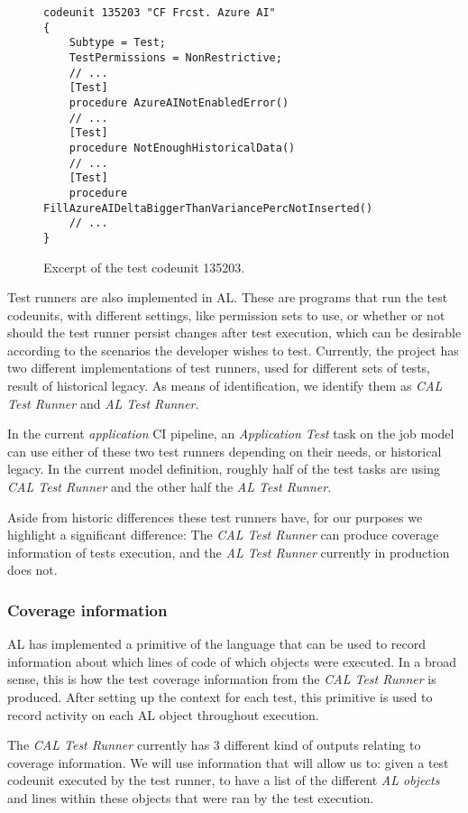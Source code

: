 \begin{figure}
    \begin{Verbatim}[fontsize=\small]
codeunit 135203 "CF Frcst. Azure AI"
{
    Subtype = Test;
    TestPermissions = NonRestrictive;
    // ...
    [Test]
    procedure AzureAINotEnabledError()
    // ...
    [Test]
    procedure NotEnoughHistoricalData()
    // ...
    [Test]
    procedure FillAzureAIDeltaBiggerThanVariancePercNotInserted()
    // ...
}
    \end{Verbatim}
    \caption{Excerpt of the test codeunit 135203.}
    \label{fig:bg-bc-test-codeunit}
\end{figure}

Test runners are also implemented in AL. These are programs that run the test codeunits, with different
settings, like permission sets to use, or whether or not should the test runner persist changes after 
test execution, which can be desirable according to the scenarios the developer wishes to test. Currently, 
the project has two different implementations of test runners, used for different
sets of tests, result of historical legacy. As means of identification, we identify them 
as \emph{CAL Test Runner} and \emph{AL Test Runner}.

In the current \emph{application} CI pipeline, an \emph{Application Test} task on the job model can use either of these 
two test runners depending on their needs, or historical legacy. In the current model definition,
roughly half of the test tasks are using \emph{CAL Test Runner} and the other half the \emph{AL Test Runner}.

Aside from historic differences these test runners have, for our purposes we highlight a significant
difference: The \emph{CAL Test Runner} can produce coverage information of tests execution, and the \emph{AL Test Runner}
currently in production does not.

\subsubsection{Coverage information}\label{s:bg-bc-coverage}
AL has implemented a primitive of the language that can be used to record information about which lines 
of code of which objects were executed. In a broad sense, this is how the test coverage information from 
the \emph{CAL Test Runner} is produced. After setting up the context for each test, this primitive is used
to record activity on each AL object throughout execution.

The \emph{CAL Test Runner} currently has 3 different kind of outputs relating to coverage information.
We will use information that will allow us to: given a test codeunit executed by the test runner, 
to have a list of the different \emph{AL objects} and lines within these objects that were ran by
the test execution.

